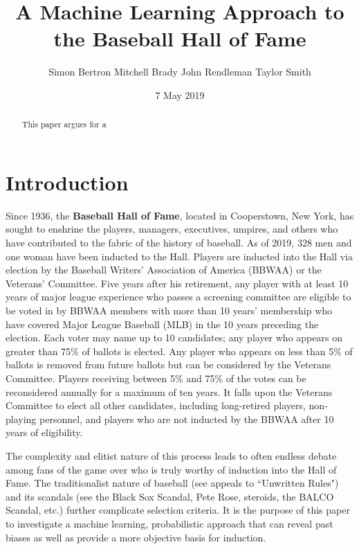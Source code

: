 \documentclass{sigkddExp}
\begin{document}
\title{A Machine Learning Approach to the Baseball Hall of Fame}


\author{
Simon Bertron 
\quad Mitchell Brady 
\quad John Rendleman 
\quad Taylor Smith
}

\date{7 May 2019}
\maketitle
\begin{abstract}
This paper argues for a 
\end{abstract}

\section{Introduction}
Since 1936, the \textbf{Baseball Hall of Fame}, located in Cooperstown, New York, has sought to enshrine the players, managers, executives, umpires, and others who have contributed to the fabric of the history of baseball. As of 2019, 328 men and one woman have been inducted to the Hall. Players are inducted into the Hall via election by the Baseball Writers' Association of America (BBWAA) or the Veterans' Committee. Five years after his retirement, any player with at least 10 years of major league experience who passes a screening committee are eligible to be voted in by BBWAA members with more than 10 years' membership who have covered Major League Baseball (MLB) in the 10 years preceding the election. Each voter may name up to 10 candidates; any player who appears on greater than 75\% of ballots is elected. Any player who appears on less than 5\% of ballots is removed from future ballots but can be considered by the Veterans Committee. Players receiving between 5\% and 75\% of the votes can be reconsidered annually for a maximum of ten years. It falls upon the Veterans Committee to elect all other candidates, including long-retired players, non-playing personnel, and players who are not inducted by the BBWAA after 10 years of eligibility.

The complexity and elitist nature of this process leads to often endless debate among fans of the game over who is truly worthy of induction into the Hall of Fame. The traditionalist nature of baseball (see appeals to ``Unwritten Rules") and its scandals (see the Black Sox Scandal, Pete Rose, steroids, the BALCO Scandal, etc.) further complicate selection criteria. It is the purpose of this paper to investigate a machine learning, probabilistic approach that can reveal past biases as well as provide a more objective basis for induction. 
\end{document}
